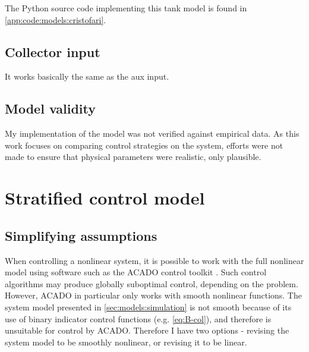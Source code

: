The Python source code implementing this tank model is found in \autoref{app:code:models:cristofari}.

\subsection{Collector input}

It works basically the same as the aux input.

\subsection{Model validity}

My implementation of the model was not verified against empirical data.
As this work focuses on comparing control strategies on the system, efforts were not made to ensure that physical parameters were realistic, only plausible.

\section{Stratified control model}
\label{sec:models:control}

\subsection{Simplifying assumptions}

When controlling a nonlinear system, it is possible to work with the full nonlinear model using software such as the ACADO control toolkit \textcite{ACADO}.
Such control algorithms may produce globally suboptimal control, depending on the problem.
However, ACADO in particular only works with smooth nonlinear functions.
The system model presented in \autoref{sec:models:simulation} is not smooth because of its use of binary indicator control functions (e.g. \autoref{eq:B-col}), and therefore is unsuitable for control by ACADO.
Therefore I have two options - revising the system model to be smoothly nonlinear, or revising it to be linear.

